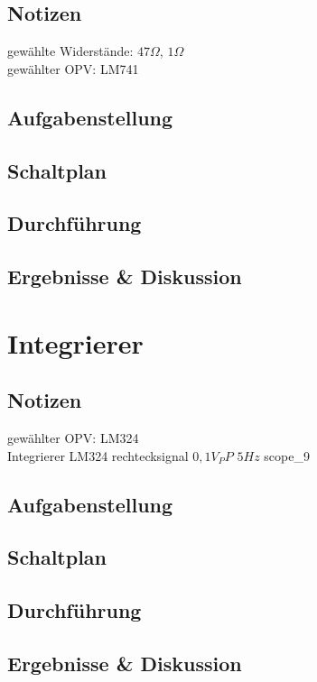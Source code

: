 \documentclass[12pt,a4paper,titlepage]{article}
\begin{document}
\subsection*{Notizen}
gew\"ahlte Widerst\"ande: $47\Omega$, $1\Omega$ \\
gew\"ahlter OPV: LM741 \\

\subsection*{Aufgabenstellung}

\subsection*{Schaltplan}

\subsection*{Durchf\"uhrung}

\subsection*{Ergebnisse \& Diskussion}


\section{Integrierer}

\subsection*{Notizen}
gew\"ahlter OPV: LM324 \\
Integrierer LM324 rechtecksignal $0,1 V_PP$ $5Hz$ scope\_9
\subsection*{Aufgabenstellung}

\subsection*{Schaltplan}

\subsection*{Durchf\"uhrung}

\subsection*{Ergebnisse \& Diskussion}
\end{document}
